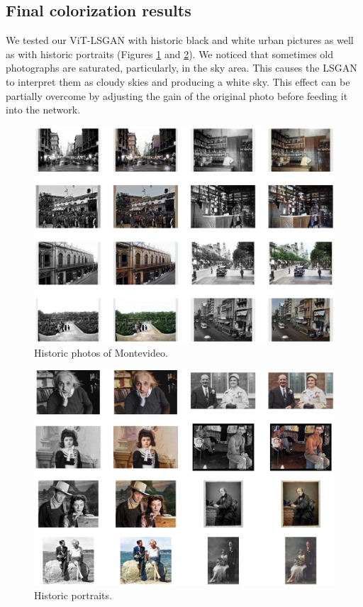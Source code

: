 \documentclass[
]{article}
\begin{document}
\hypertarget{final-colorization-results}{%
\subsection{Final colorization
results}\label{final-colorization-results}}

We tested our ViT-LSGAN with historic black and white urban pictures as
well as with historic portraits (Figures \ref{fig:Montevideo} and \ref{fig:portraits}). We noticed that sometimes old
photographs are saturated, particularly, in the sky area. This causes
the LSGAN to interpret them as cloudy skies and producing a white sky.
This effect can be partially overcome by adjusting the gain of the
original photo before feeding it into the network.

\begin{figure}
\centering
\includegraphics{Project_files/Project_72_0.png}
\caption{Historic photos of Montevideo.}
\label{fig:Montevideo}
\end{figure}

\begin{figure}
\centering
\includegraphics{Project_files/Project_73_0.png}
\caption{Historic portraits.}
\label{fig:portraits}
\end{figure}
\end{document}
